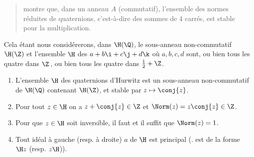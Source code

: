 \documentclass[11pt, %
  title in boldface,
  theorem in new line,
  theorem numbering = section,
  number theorems separately,
  simple name,
]{beaulivre}
\begin{document}
    \begin{quote}
         montre que, dans un anneau \( A \) (commutatif), l'ensemble des normes réduites de quaternions, c'est-à-dire des sommes de \( 4 \) carrés, est stable pour la multiplication.
    \end{quote}

    Cela étant nous considérerons, dans \( \H(\Q) \), le sous-anneau non-commutatif \( \H(\Z) \) et l'ensemble \( \H \) des  \( a+b\i+c\j+d\k \) où \( a,b,c,d \) sont, ou bien tous les quatre dans \( \Z \)\,, ou bien tous les quatre dans \( \frac{1}{2}+\Z \).

    \begin{lemma}\label{lem:quaternions d'Hurwitz}
        \begin{enumerate}
            \item \label{lem:quaternions d'Hurwitz;item1} L'ensemble \( \H \) des quaternions d'Hurwitz est un sous-anneau non-commutatif de \( \H(\Q) \) contenant \( \H(\Z) \), et stable par \( z \mapsto \conj{z} \).
            \item \label{lem:quaternions d'Hurwitz;item2} Pour tout \( z \in \H \) on a \( z+\conj{z} \in \Z \) et \( \Norm(z) = z\conj{z} \in \Z \).
            \item \label{lem:quaternions d'Hurwitz;item3} Pour que \( z \in \H \) soit inversible, il faut et il suffit que \( \Norm(z) = 1 \).
            \item \label{lem:quaternions d'Hurwitz;item4} Tout idéal à gauche (resp. à droite) \( a \) de \( \H \) est principal (\ie. est de la forme \( \H z \) (resp. \( z \H \))).
        \end{enumerate}
    \end{lemma}
\end{document}

